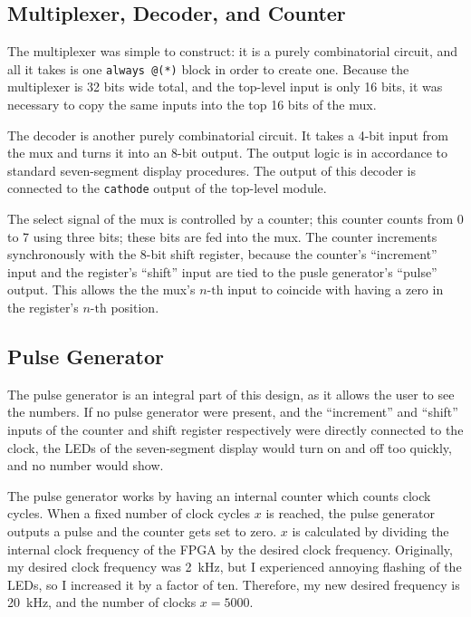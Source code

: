 \documentclass{article}
\begin{document}
\subsection{Multiplexer, Decoder, and Counter} The multiplexer
was simple to construct:
it is a purely combinatorial circuit, and all it takes is one
\texttt{always @(*)} block in order to create one. Because
the multiplexer is 32 bits wide total, and the top-level
input is only 16 bits, it was necessary to copy the same
inputs into the top 16 bits of the mux.

The decoder is another purely combinatorial circuit. It takes
a 4-bit input from the mux and turns it into an 8-bit
output. The output logic is in accordance to standard
seven-segment display procedures. The output of this
decoder is connected to the \texttt{cathode} output of the
top-level module.

The select signal of the mux is controlled by a counter; this
counter counts from \num{0} to \num{7} using three bits; these
bits are fed into the mux. The counter increments synchronously
with the 8-bit shift register, because the counter's ``increment''
input and the register's ``shift'' input are tied to the pusle
generator's ``pulse'' output. This allows the the mux's
\(n\text{-th}\) input to coincide with having a zero in the
register's \(n\text{-th}\) position.

\subsection{Pulse Generator} The pulse generator is an integral
part of this design, as it allows the user to see the numbers.
If no pulse generator were present, and the ``increment'' and
``shift'' inputs of the counter and shift register respectively
were directly connected to the clock, the LEDs of the
seven-segment display would turn on and off too quickly, and no
number would show.

The pulse generator works by having an
internal counter which counts clock cycles. When a fixed number
of clock cycles \(x\) is reached, the pulse generator outputs a
pulse and the counter gets set to zero. \(x\) is calculated by
dividing the internal clock frequency of the FPGA by the desired
clock frequency. Originally, my desired clock frequency was
\SI{2}{\kilo\hertz}, but I experienced annoying flashing of the
LEDs, so I increased it by a factor of ten. Therefore, my new
desired frequency is \SI{20}{\kilo\hertz}, and the number of
clocks \(x = 5000\).
\end{document}
